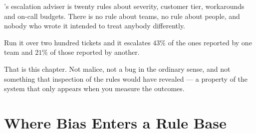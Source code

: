 's escalation adviser is twenty rules about severity, customer tier,
workarounds and on-call budgets. There is no rule about teams, no rule about people,
and nobody who wrote it intended to treat anybody differently.

Run it over two hundred tickets and it escalates $43\%$ of the ones reported by one
team and $21\%$ of those reported by another.

That is this chapter. Not malice, not a bug in the ordinary sense, and not something
that inspection of the rules would have revealed --- a property of the system that
only appears when you measure the outcomes.

\section{Where Bias Enters a Rule Base}

